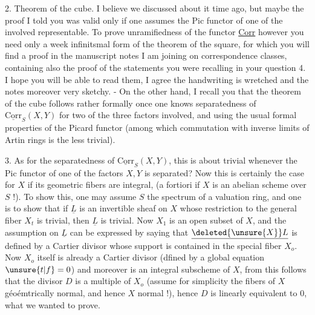 2. Theorem of the cube. I believe we discussed about it time ago, but maybe the proof I told you was valid only if one assumes the Pic functor of one of the  involved representable. To prove unramifiedness of the functor \uline{Corr} however you need only a week infinitsmal form of the theorem of the square, for which you will find a proof in the manuscript notes I am joining on correspondence classes, containing also the proof of the statements you were recalling in your question 4. I hope you will be able to read them, I agree the handwriting is wretched and the notes moreover very sketchy. - On the other hand, I recall you that the theorem of the cube follows rather formally once one knows separatedness of $\underline{\mathrm{Corr}}_{S}(X,Y)$ for two of the three factors involved, and using the usual formal properties of the Picard functor (among which commutation with inverse limits of Artin rings is the less trivial).

3. As for the separatedness of $\underline{\mathrm{Corr}}_{S}(X,Y)$, this is about trivial whenever the Pic functor of one of the factors $X,Y$ is separated? Now this is certainly the case  for $X$ if its geometric fibers are integral, (a fortiori if $X$ is an abelian scheme over $S$ !). To show this, one may assume $S$ the spectrum of a  valuation ring, and one is  to show that if $\underline{L}$ is an invertible sheaf on $X$ whose restriction to the general fiber $X_{t}$ is trivial, then $\underline{L}$ is trivial. Now $X_{1}$ is an open subset of $X$, and the assumption on $\underline{L}$ can be expressed by saying that $\underline{\deleted{\unsure{X}}L}$ is defined by a Cartier divisor whose support is contained in the special fiber $X_{o}$. Now $X_{o}$ itself is already a Cartier divisor (dfined by a global equation $\unsure{t|f}=0$) and moreover is an integral subscheme of $X$, from this follows that the divisor $D$ is a multiple of $X_{o}$ (assume for
simplicity the fibers of $X$ géoémtrically normal, and hence $X$ normal !), hence $D$ is linearly equivalent to $0$, what we wanted to prove.

